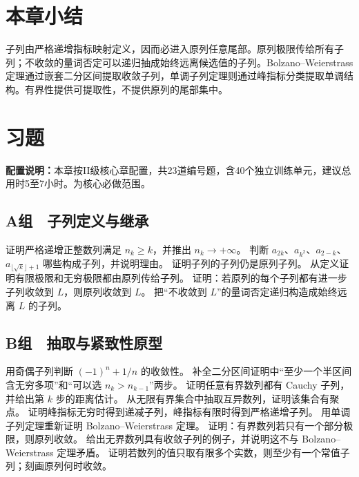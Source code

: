 \section*{本章小结}

子列由严格递增指标映射定义，因而必进入原列任意尾部。原列极限传给所有子列；不收敛的量词否定可以递归抽成始终远离候选值的子列。Bolzano--Weierstrass 定理通过嵌套二分区间提取收敛子列，单调子列定理则通过峰指标分类提取单调结构。有界性提供可提取性，不提供原列的尾部集中。

\section*{习题}

\noindent\textbf{配置说明：}本章按II级核心章配置，共23道编号题，含40个独立训练单元，建议总用时5至7小时。为核心必做范围。

\subsection*{A组　子列定义与继承}
\begin{enumerate}[label=\textbf{11.\arabic*.}]
  \mustdo 证明严格递增正整数列满足 \(n_k\ge k\)，并推出 \(n_k\to+\infty\)。
  \mustdo 判断 \(a_{2k}\)、\(a_{k^2}\)、\(a_{2-k}\)、\(a_{\lfloor\sqrt k\rfloor+1}\) 哪些构成子列，并说明理由。
  \mustdo 证明子列的子列仍是原列子列。
  \mustdo 从定义证明有限极限和无穷极限都由原列传给子列。
  \mustdo 证明：若原列的每个子列都有进一步子列收敛到 \(L\)，则原列收敛到 \(L\)。
  \mustdo 把“不收敛到 \(L\)”的量词否定递归构造成始终远离 \(L\) 的子列。
\end{enumerate}

\subsection*{B组　抽取与紧致性原型}
\begin{enumerate}[label=\textbf{11.\arabic*.},resume]
  \mustdo 用奇偶子列判断 \((-1)^n+1/n\) 的收敛性。
  \mustdo 补全二分区间证明中“至少一个半区间含无穷多项”和“可以选 \(n_k>n_{k-1}\)”两步。
  \mustdo 证明任意有界数列都有 Cauchy 子列，并给出第 \(k\) 步的距离估计。
  \mustdo 从无限有界集合中抽取互异数列，证明该集合有聚点。
  \mustdo 证明峰指标无穷时得到递减子列，峰指标有限时得到严格递增子列。
  \mustdo 用单调子列定理重新证明 Bolzano--Weierstrass 定理。
  \mustdo 证明：有界数列若只有一个部分极限，则原列收敛。
  \mustdo 给出无界数列具有收敛子列的例子，并说明这不与 Bolzano--Weierstrass 定理矛盾。
  \mustdo 证明若数列的值只取有限多个实数，则至少有一个常值子列；刻画原列何时收敛。
\end{enumerate}

